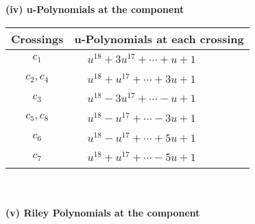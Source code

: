 \documentclass[1p]{elsarticle_modified}
\theoremstyle{definition}
\begin{document}
\newpage\renewcommand{\arraystretch}{1}
\flushleft \textbf{(iv) u-Polynomials at the component}\newline \\
\begin{tabular}{m{50pt}|m{274pt}}
Crossings & \hspace{64pt}u-Polynomials at each crossing \\
\hline $$\begin{aligned}c_{1}\end{aligned}$$&$\begin{aligned}
&u^{18}+3 u^{17}+\cdots+u+1
\end{aligned}$\\
\hline $$\begin{aligned}c_{2},c_{4}\end{aligned}$$&$\begin{aligned}
&u^{18}+u^{17}+\cdots+3 u+1
\end{aligned}$\\
\hline $$\begin{aligned}c_{3}\end{aligned}$$&$\begin{aligned}
&u^{18}-3 u^{17}+\cdots- u+1
\end{aligned}$\\
\hline $$\begin{aligned}c_{5},c_{8}\end{aligned}$$&$\begin{aligned}
&u^{18}- u^{17}+\cdots-3 u+1
\end{aligned}$\\
\hline $$\begin{aligned}c_{6}\end{aligned}$$&$\begin{aligned}
&u^{18}- u^{17}+\cdots+5 u+1
\end{aligned}$\\
\hline $$\begin{aligned}c_{7}\end{aligned}$$&$\begin{aligned}
&u^{18}+u^{17}+\cdots-5 u+1
\end{aligned}$\\
\hline
\end{tabular}\\~\\
\newpage\renewcommand{\arraystretch}{1}
\flushleft \textbf{(v) Riley Polynomials at the component}\newline \\
\end{document}
